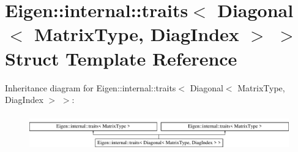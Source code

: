 \hypertarget{struct_eigen_1_1internal_1_1traits_3_01_diagonal_3_01_matrix_type_00_01_diag_index_01_4_01_4}{}\section{Eigen\+:\+:internal\+:\+:traits$<$ Diagonal$<$ Matrix\+Type, Diag\+Index $>$ $>$ Struct Template Reference}
\label{struct_eigen_1_1internal_1_1traits_3_01_diagonal_3_01_matrix_type_00_01_diag_index_01_4_01_4}
Inheritance diagram for Eigen\+:\+:internal\+:\+:traits$<$ Diagonal$<$ Matrix\+Type, Diag\+Index $>$ $>$\+:\begin{figure}[H]
\begin{center}
\leavevmode
\includegraphics[height=1.559888cm]{struct_eigen_1_1internal_1_1traits_3_01_diagonal_3_01_matrix_type_00_01_diag_index_01_4_01_4}
\end{center}
\end{figure}

